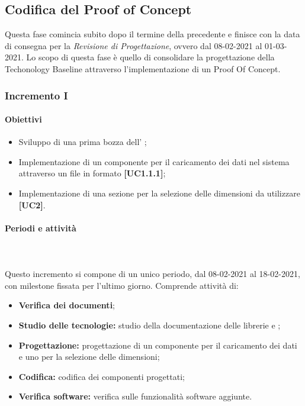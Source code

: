 \subsection{Codifica del Proof of Concept}
Questa fase comincia subito dopo il termine della precedente e finisce con la data di consegna per la \textit{Revisione di Progettazione}, ovvero dal 08-02-2021 al 01-03-2021. Lo scopo di questa fase è quello di consolidare la progettazione della Techonology Baseline attraverso l'implementazione di un Proof Of Concept.
\subsubsection{Incremento I}
\paragraph{Obiettivi}
\begin{itemize}
\item Sviluppo di una prima bozza dell' ;
\item Implementazione di un componente per il caricamento dei dati nel sistema attraverso un file in formato  \textbf{[UC1.1.1]};
\item Implementazione di una sezione per la selezione delle dimensioni da utilizzare \textbf{[UC2]}.
\end{itemize}
		
\paragraph{Periodi e attività} \mbox{}\\\mbox{}\\
Questo incremento si compone di un unico periodo, dal 08-02-2021 al 18-02-2021, con milestone fissata per l'ultimo giorno. Comprende attività di:
\begin{itemize}
\item \textbf{Verifica dei documenti};
\item \textbf{Studio delle tecnologie:} studio della documentazione delle librerie  e ;
\item \textbf{Progettazione:} progettazione di un componente per il caricamento dei dati e uno per la selezione delle dimensioni;
\item \textbf{Codifica:} codifica dei componenti progettati;
\item \textbf{Verifica software:} verifica sulle funzionalità software aggiunte.
\end{itemize}

